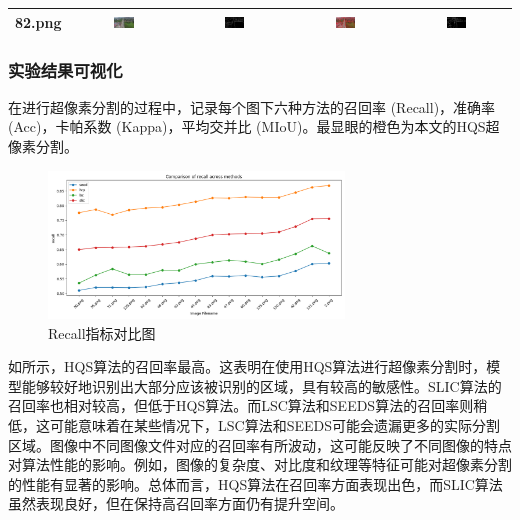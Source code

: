 \begin{table}[htbp]
\begin{tabular}{ccccc}
      82.png & \includegraphics[width=0.2\textwidth]{pic/raw/82.png} & \includegraphics[width=0.2\textwidth]{pic/rcf/82.png} & \includegraphics[width=0.2\textwidth]{pic/hqs/500/82.png} & \includegraphics[width=0.2\textwidth]{pic/gt/82.png} \\
      \bottomrule
    \end{tabular}
    \label{tab:result}
  \end{table}

  \newpage

\subsubsection{实验结果可视化}
在进行超像素分割的过程中，记录每个图下六种方法的召回率 (Recall)，准确率 (Acc)，卡帕系数 (Kappa)，平均交并比 (MIoU)。最显眼的橙色为本文的HQS超像素分割。

\begin{figure}[htbp]
	\centering
	\includegraphics[width=0.7\textwidth]{pic/recall.png}
	\caption{Recall指标对比图}
    \label{fig:recall}
\end{figure}

如所示，HQS算法的召回率最高。这表明在使用HQS算法进行超像素分割时，模型能够较好地识别出大部分应该被识别的区域，具有较高的敏感性。SLIC算法的召回率也相对较高，但低于HQS算法。而LSC算法和SEEDS算法的召回率则稍低，这可能意味着在某些情况下，LSC算法和SEEDS可能会遗漏更多的实际分割区域。图像中不同图像文件对应的召回率有所波动，这可能反映了不同图像的特点对算法性能的影响。例如，图像的复杂度、对比度和纹理等特征可能对超像素分割的性能有显著的影响。总体而言，HQS算法在召回率方面表现出色，而SLIC算法虽然表现良好，但在保持高召回率方面仍有提升空间。

